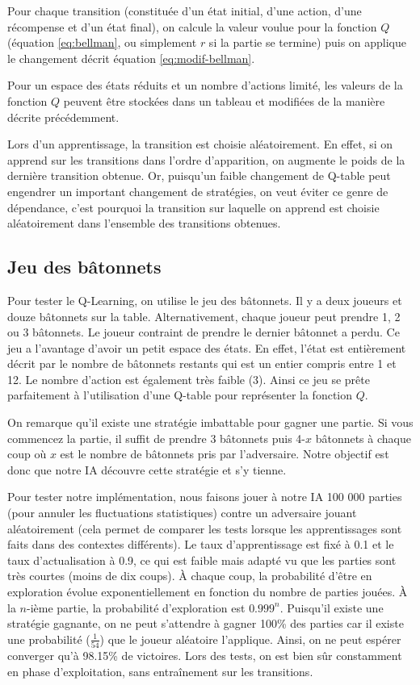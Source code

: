 Pour chaque transition (constituée d'un état initial, d'une action, d'une récompense et d'un état final), on calcule la valeur voulue pour la fonction $Q$ 
(équation \ref{eq:bellman}, ou simplement $r$ si la partie se termine) puis on applique le changement décrit équation \ref{eq:modif-bellman}.

Pour un espace des états réduits et un nombre d'actions limité, les valeurs de la fonction $Q$ peuvent être stockées dans un tableau et modifiées de la manière
décrite précédemment.

Lors d'un apprentissage, la transition est choisie aléatoirement. En effet, si on apprend sur les transitions dans l'ordre d'apparition, on augmente le poids de la
dernière transition obtenue. Or, puisqu'un faible changement de Q-table peut engendrer un important changement de stratégies, on veut éviter ce genre de dépendance,
c'est pourquoi la transition sur laquelle on apprend est choisie aléatoirement dans l'ensemble des transitions obtenues.


\subsection{Jeu des bâtonnets}

Pour tester le Q-Learning, on utilise le jeu des bâtonnets. Il y a deux joueurs et douze bâtonnets sur la table. Alternativement, chaque joueur peut prendre
1, 2 ou 3 bâtonnets. Le joueur contraint de prendre le dernier bâtonnet a perdu. Ce jeu a l'avantage d'avoir un petit espace des états. En effet, l'état est entièrement
décrit par le nombre de bâtonnets restants qui est un entier compris entre 1 et 12. Le nombre d'action est également très faible (3). Ainsi ce jeu se prête parfaitement à
l'utilisation d'une Q-table pour représenter la fonction $Q$.

On remarque qu'il existe une stratégie imbattable pour gagner une partie. Si vous commencez la partie, il suffit de prendre 3 bâtonnets puis 4-$x$ bâtonnets à chaque coup
où $x$ est le nombre de bâtonnets pris par l'adversaire. Notre objectif est donc que notre IA découvre cette stratégie et s'y tienne. 

Pour tester notre implémentation, nous faisons jouer à notre IA 100 000 parties (pour annuler les fluctuations statistiques) contre un adversaire jouant aléatoirement
(cela permet de comparer les tests lorsque les apprentissages sont faits dans des contextes différents). Le taux d'apprentissage est fixé à 0.1 et le taux d'actualisation
à 0.9, ce qui est faible mais adapté vu que les parties sont très courtes (moins de dix coups). À chaque coup, la probabilité d'être en exploration évolue 
exponentiellement en fonction du nombre de parties jouées. À la $n$-ième partie, la probabilité d'exploration est $0.999^n$. Puisqu'il existe une stratégie gagnante,
on ne peut s'attendre à gagner 100\% des parties car il existe une probabilité ($\frac{1}{54}$) que le joueur aléatoire l'applique. Ainsi, on ne peut espérer 
converger qu'à 98.15\% de victoires. Lors des tests, on est bien sûr constamment en phase d'exploitation, sans entraînement sur les transitions.

